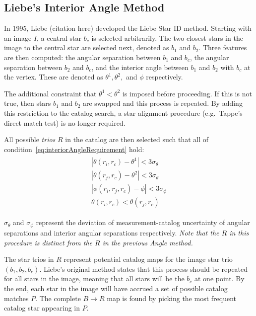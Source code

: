 \subsection{Liebe's Interior Angle Method}\label{subsec:liebe'sInteriorAngleMethod}
In 1995, Liebe (citation here) developed the Liebe Star ID method. Starting with an image $I$, a central star $b_c$ is
selected arbitrarily. The two closest stars in the image to the central star are selected next, denoted as $b_1$ and
$b_2$. Three features are then computed: the angular separation between $b_1$ and $b_c$, the angular separation between
$b_2$ and $b_c$, and the interior angle between $b_1$ and $b_2$ with $b_c$ at the vertex. These are denoted as
$\theta^1, \theta^2,$ and $\phi$ respectively.

The additional constraint that $\theta^1 < \theta^2$ is imposed before proceeding. If this is not true, then stars
$b_1$ and $b_2$ are swapped and this process is repeated. By adding this restriction to the catalog search, a star
alignment procedure (e.g.\ Tappe's direct match test) is no longer required.

All possible \textit{trios} $R$ in the catalog are then selected such that all of
condition~\eqref{eq:interiorAngleRequirement} hold:
\begin{align}
    \label{eq:interiorAngleRequirement}
    \begin{split}
        |\theta(r_i, r_c) - \theta^1| < 3 \sigma_{\theta}
        \\
        |\theta(r_j, r_c) - \theta^2| < 3 \sigma_{\theta}
        \\
        |\phi(r_i, r_j, r_c) - \phi| < 3 \sigma_{\phi}
        \\
        \theta(r_i, r_c) < \theta(r_j, r_c)
    \end{split}
\end{align}

$\sigma_{\theta}$ and $\sigma_{\phi}$ represent the deviation of measurement-catalog uncertainty of angular separations
and interior angular separations respectively. \textit{Note that the $R$ in this procedure is distinct from the $R$ in
the previous Angle method.}

The star trios in $R$ represent potential catalog maps for the image star trio $(b_1, b_2, b_c)$. Liebe's original
method states that this process should be repeated for all stars in the image, meaning that all stars will be the $b_c$
at one point. By the end, each star in the image will have accrued a set of possible catalog matches $P$. The complete
$B \rightarrow R$ map is found by picking the most frequent catalog star appearing in $P$.

